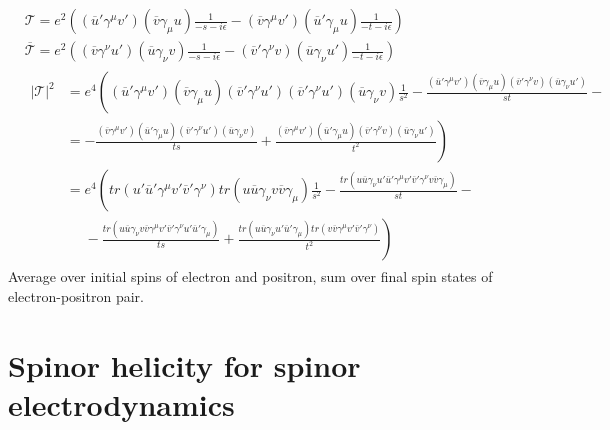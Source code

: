 \documentclass[twoside]{amsart}
\begin{document}
\[
\begin{aligned}
  & \mathcal{T} = e^2 ( (\overline{u}' \gamma^{\mu} v' )( \overline{v} \gamma_{\mu} u ) \frac{1}{ -s - i \epsilon } - ( \overline{v} \gamma^{\mu} v')( \overline{u}' \gamma_{\mu} u ) \frac{1}{ - t - i \epsilon } )  \\ 
  & \overline{\mathcal{T}} = e^2 ( (\overline{v} \gamma^{\nu} u') ( \overline{u} \gamma_{\nu} v) \frac{1}{ -s - i \epsilon } - (\overline{v}' \gamma^{\nu} v)( \overline{u} \gamma_{\nu} u' ) \frac{1}{ -t -i \epsilon } ) \\
  & \begin{aligned} |\mathcal{T}|^2 & = e^4 \left( (\overline{u}' \gamma^{\mu} v')( \overline{v} \gamma_{\mu} u ) ( \overline{v}' \gamma^{\nu} u') (\overline{v}' \gamma^{\nu} u')( \overline{u} \gamma_{\nu} v) \frac{1}{s^2} - \frac{ (\overline{u}' \gamma^{\mu} v' )( \overline{v} \gamma_{\mu} u)( \overline{v}' \gamma^{\nu} v)( \overline{u} \gamma_{\nu} u') }{ st} - \right. \\
      & = \left.  - \frac{ (\overline{v} \gamma^{\mu} v')( \overline{u}' \gamma_{\mu} u) ( \overline{v}' \gamma^{\nu} u')( \overline{u} \gamma_{\nu} v) }{ ts} + \frac{ (\overline{v} \gamma^{\mu} v')( \overline{u}' \gamma_{\mu} u)( \overline{v}' \gamma^{\nu} v)( \overline{u} \gamma_{\nu} u' ) }{ t^2} \right) \\
      & = e^4 \left( tr( u'\overline{u}' \gamma^{\mu} v' \overline{v}' \gamma^{\nu} ) tr( u \overline{u} \gamma_{\nu} v\overline{v} \gamma_{\mu} ) \frac{1}{s^2} - \frac{ tr( u\overline{u} \gamma_{\nu} u' \overline{u}' \gamma^{\mu} v' \overline{v}' \gamma^{\nu} v\overline{v} \gamma_{\mu} )}{st} - \right. \\
      & \left. \phantom{=} - \frac{ tr( u \overline{u} \gamma_{\nu} v\overline{v} \gamma^{\mu} v'\overline{v}' \gamma^{\nu} u' \overline{u}' \gamma_{\mu} ) }{ ts} + \frac{ tr( u\overline{u} \gamma_{\nu} u' \overline{u}' \gamma_{\mu} ) tr(v\overline{v} \gamma^{\mu} v'\overline{v}' \gamma^{\nu} ) }{t^2} \right)
\end{aligned}
\end{aligned}
\]
Average over initial spins of electron and positron, sum over final spin states of electron-positron pair.  




\section{Spinor helicity for spinor electrodynamics}
\end{document}
